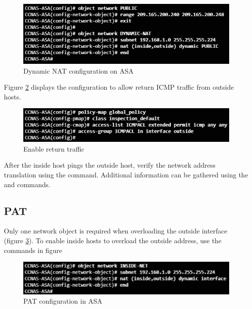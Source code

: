\begin{figure}[hbtp]
\caption{Dynamic NAT configuration on ASA}\label{DynamicNAT}
\centering
\includegraphics[scale=0.7]{pictures/DynamicNAT.PNG}
\end{figure}

Figure \ref{DynamicNATreturn} displays the configuration to allow return ICMP traffic from outside hosts.

\begin{figure}[hbtp]
\caption{Enable return traffic}\label{DynamicNATreturn}
\centering
\includegraphics[scale=0.7]{pictures/DynamicNATreturn.PNG}
\end{figure}

After the inside host pings the outside host, verify the network address translation using the  command. Additional information can be gathered using the  and  commands.

\subsection{PAT}

Only one network object is required when overloading the outside interface (figure \ref{PAT}). To enable inside hosts to overload the outside address, use the commands in figure 

\begin{figure}[hbtp]
\caption{PAT configuration in ASA}\label{PAT}
\centering
\includegraphics[scale=0.7]{pictures/PAT.PNG}
\end{figure}

